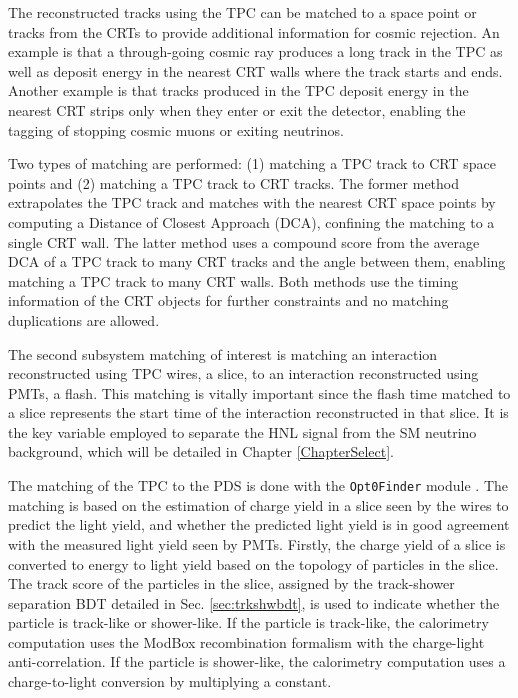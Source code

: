 The reconstructed tracks using the TPC can be matched to a space point or tracks from the CRTs to provide additional information for cosmic rejection.
An example is that a through-going cosmic ray produces a long track in the TPC as well as deposit energy in the nearest CRT walls where the track starts and ends. 
Another example is that tracks produced in the TPC deposit energy in the nearest CRT strips only when they enter or exit the detector, enabling the tagging of stopping cosmic muons or exiting neutrinos.

Two types of matching are performed: (1) matching a TPC track to CRT space points and (2) matching a TPC track to CRT tracks.
The former method extrapolates the TPC track and matches with the nearest CRT space points by computing a Distance of Closest Approach (DCA), confining the matching to a single CRT wall. 
The latter method uses a compound score from the average DCA of a TPC track to many CRT tracks and the angle between them, enabling matching a TPC track to many CRT walls.
Both methods use the timing information of the CRT objects for further constraints and no matching duplications are allowed.

The second subsystem matching of interest is matching an interaction reconstructed using TPC wires, a slice, to an interaction reconstructed using PMTs, a flash.                                        
This matching is vitally important since the flash time matched to a slice represents the start time of the interaction reconstructed in that slice.
It is the key variable employed to separate the HNL signal from the SM neutrino background, which will be detailed in Chapter \ref{ChapterSelect}.

The matching of the TPC to the PDS is done with the \texttt{Opt0Finder} module \cite{opt0finder_module}.
The matching is based on the estimation of charge yield in a slice seen by the wires to predict the light yield, and whether the predicted light yield is in good agreement with the measured light yield seen by PMTs.
Firstly, the charge yield of a slice is converted to energy to light yield based on the topology of particles in the slice.
The track score of the particles in the slice, assigned by the track-shower separation BDT detailed in Sec. \ref{sec:trkshwbdt}, is used to indicate whether the particle is track-like or shower-like.
If the particle is track-like, the calorimetry computation uses the ModBox recombination formalism with the charge-light anti-correlation. 
If the particle is shower-like, the calorimetry computation uses a charge-to-light conversion by multiplying a constant.     


